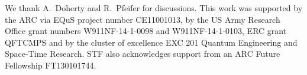 \documentclass[aps, prl, letterpaper, twocolumn, superscriptaddress, notitlepage, 10pt]{revtex4-1}
\begin{document}
\acknowledgments 

We thank A.\ Doherty and R.\ Pfeifer for discussions. 
This work was supported by the ARC via EQuS project number CE11001013, by the US Army Research Office grant numbers W911NF-14-1-0098 and W911NF-14-1-0103, ERC grant QFTCMPS and by the cluster of excellence EXC 201 Quantum Engineering and Space-Time Research. STF also acknowledges support from an ARC Future Fellowship FT130101744.


\end{document}
